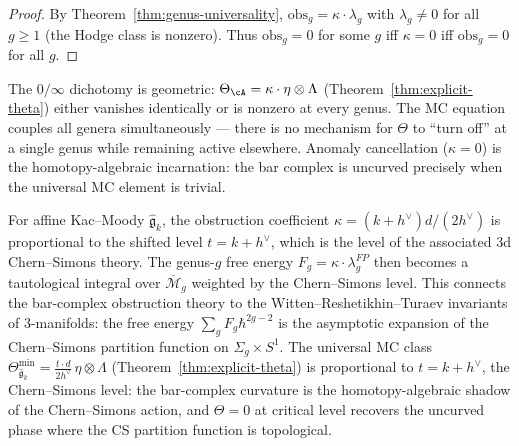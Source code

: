 \begin{proof}
By Theorem~\ref{thm:genus-universality}, $\mathrm{obs}_g = \kappa \cdot \lambda_g$ with $\lambda_g \neq 0$ for all $g \geq 1$ (the Hodge class is nonzero).  Thus $\mathrm{obs}_g = 0$ for some $g$ iff $\kappa = 0$ iff $\mathrm{obs}_g = 0$ for all $g$.
\end{proof}

\begin{remark}
\label{rem:dichotomy-theta}
The $0/\infty$ dichotomy is geometric:
$\Theta_{\cA} = \kappa \cdot \eta \otimes \Lambda$
(Theorem~\ref{thm:explicit-theta}) either vanishes
identically or is nonzero at every genus.
The MC equation couples all genera simultaneously ---
there is no mechanism for $\Theta$ to ``turn off'' at a
single genus while remaining active elsewhere.
Anomaly cancellation ($\kappa = 0$) is the homotopy-algebraic
incarnation: the bar complex is uncurved precisely when the
universal MC element is trivial.
\end{remark}

\begin{remark}\label{rem:kappa-chern-simons}
For affine Kac--Moody $\widehat{\mathfrak{g}}_k$, the obstruction coefficient $\kappa = (k+h^\vee)d/(2h^\vee)$ is proportional to the shifted level $t = k + h^\vee$, which is the level of the associated 3d Chern--Simons theory.  The genus-$g$ free energy $F_g = \kappa \cdot \lambda_g^{FP}$ then becomes a tautological integral over $\overline{\mathcal{M}}_g$ weighted by the Chern--Simons level.  This connects the bar-complex obstruction theory to the Witten--Reshetikhin--Turaev invariants of 3-manifolds: the free energy $\sum_g F_g \hbar^{2g-2}$ is the asymptotic expansion of the Chern--Simons partition function on $\Sigma_g \times S^1$.
The universal MC class
$\Theta_{\widehat{\mathfrak{g}}_k}^{\min} =
\frac{t \cdot d}{2h^\vee}\,\eta \otimes \Lambda$
(Theorem~\ref{thm:explicit-theta}) is proportional to
$t = k + h^\vee$, the Chern--Simons level: the
bar-complex curvature is the homotopy-algebraic shadow of the
Chern--Simons action, and $\Theta = 0$ at critical level
recovers the uncurved phase where the CS partition function is
topological.
\end{remark}

